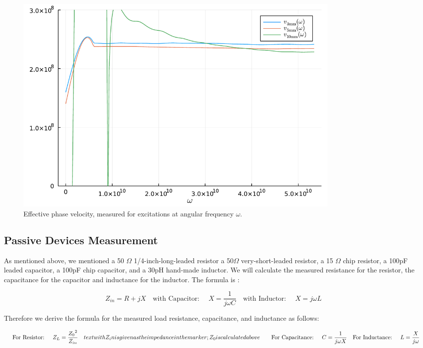 \documentclass{article}
\begin{document}
\begin{figure}[H]
  \includegraphics[width=0.8\textwidth]{figures/build/phase_vel.pdf}
  \caption{Effective phase velocity, measured for excitations at angular frequency $\omega$.}
  \label{fig:phasevel}
\end{figure}

\subsection{Passive Devices Measurement}

\begin{flushleft}
As mentioned above, we mentioned a 50 $\Omega$ 1/4-inch-long-leaded resistor a 50$\Omega$ very-short-leaded resistor, a 15 $\Omega$ chip resistor, a 100pF leaded capacitor, a 100pF chip capacitor, and a 30pH hand-made inductor. We will calculate the measured resistance for the resistor, the capacitance for the capacitor and inductance for the inductor. The formula is :
\end{flushleft}

\begin{equation}
    Z_{in} = R + jX 
    \quad \text{with Capacitor: } \quad X= \frac{1}{j\omega C}
    \quad \text{with Inductor: } \quad X= j \omega L
\end{equation}

\begin{flushleft}
Therefore we derive the formula for the measured load resistance, capacitance, and inductance as follows:
\end{flushleft}

\begin{equation}
 
      \quad \text{For Resistor: }\quad 
    Z_L = \frac{{Z_0}^2}{Z_{in}} \quad text{with Z_in is given as the impedance in the marker; Z_0 is calculated above} \quad 
    \quad \text{For Capacitance: }\quad 
    C = \frac{1}{j \omega X} \\
    \quad \text{For Inductance: }\quad
    L = \frac{X}{j \omega}

   
\end{equation}
\end{document}
